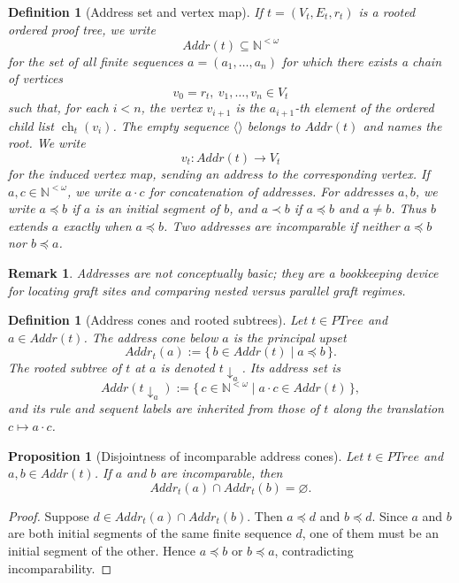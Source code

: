 \documentclass[11pt]{article}
\newtheorem{proposition}[theorem]{Proposition}
\newtheorem{definition}[theorem]{Definition}
\newtheorem{remark}[theorem]{Remark}
\newcommand{\PTree}{\mathit{PTree}}
\newcommand{\Addr}{\mathit{Addr}}
\begin{document}
\begin{definition}[Address set and vertex map]
If \(t=(V_t,E_t,r_t)\) is a rooted ordered proof tree, we write
\[
\Addr(t)\subseteq \mathbb N^{<\omega}
\]
for the set of all finite sequences \(a=(a_1,\dots,a_n)\) for which there
exists a chain of vertices
\[
v_0=r_t,\ v_1,\dots,v_n\in V_t
\]
such that, for each \(i<n\), the vertex \(v_{i+1}\) is the \(a_{i+1}\)-th
element of the ordered child list \(\operatorname{ch}_t(v_i)\). The empty
sequence \(\langle\rangle\) belongs to \(\Addr(t)\) and names the root. We write
\[
v_t:\Addr(t)\to V_t
\]
for the induced vertex map, sending an address to the corresponding vertex.
If \(a,c\in \mathbb N^{<\omega}\), we write \(a\cdot c\) for concatenation of
addresses. For addresses \(a,b\), we write \(a\preceq b\) if \(a\) is an
initial segment of \(b\), and \(a\prec b\) if \(a\preceq b\) and \(a\neq b\).
Thus \(b\) \emph{extends} \(a\) exactly when \(a\preceq b\). Two addresses are
\emph{incomparable} if neither \(a\preceq b\) nor \(b\preceq a\).
\end{definition}

\begin{remark}
Addresses are not conceptually basic; they are a bookkeeping device for
locating graft sites and comparing nested versus parallel graft regimes.
\end{remark}

\begin{definition}[Address cones and rooted subtrees]
Let \(t\in \PTree\) and \(a\in \Addr(t)\). The \emph{address cone below \(a\)}
is the principal upset
\[
\Addr_t(a):=\{\,b\in \Addr(t)\mid a\preceq b\,\}.
\]
The \emph{rooted subtree of \(t\) at \(a\)} is denoted \(t\downarrow_a\). Its
address set is
\[
\Addr(t\downarrow_a)
:=
\{\,c\in \mathbb N^{<\omega}\mid a\cdot c\in \Addr(t)\,\},
\]
and its rule and sequent labels are inherited from those of \(t\) along the
translation \(c\mapsto a\cdot c\).
\end{definition}

\begin{proposition}[Disjointness of incomparable address cones]\label{prop:disjoint-cones}
Let \(t\in\PTree\) and \(a,b\in \Addr(t)\). If \(a\) and \(b\) are
incomparable, then
\[
\Addr_t(a)\cap \Addr_t(b)=\varnothing.
\]
\end{proposition}

\begin{proof}
Suppose \(d\in \Addr_t(a)\cap \Addr_t(b)\). Then \(a\preceq d\) and
\(b\preceq d\). Since \(a\) and \(b\) are both initial segments of the same
finite sequence \(d\), one of them must be an initial segment of the other.
Hence \(a\preceq b\) or \(b\preceq a\), contradicting incomparability.
\end{proof}
\end{document}
